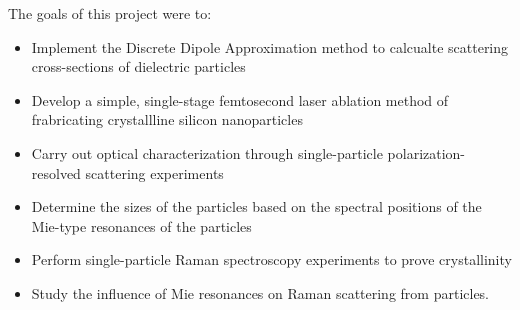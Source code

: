             The goals of this project were to:
        \begin{itemize}
            \item Implement the Discrete Dipole Approximation method to calcualte scattering cross-sections of dielectric particles
            \item Develop a simple, single-stage femtosecond laser ablation method of frabricating crystallline silicon nanoparticles
            \item Carry out optical characterization through single-particle polarization-resolved scattering experiments
            \item Determine the sizes of the particles based on the spectral positions of the Mie-type resonances of the particles
            \item Perform single-particle Raman spectroscopy experiments to prove crystallinity
            \item Study the  influence of Mie resonances on Raman scattering from particles.
        \end{itemize}
